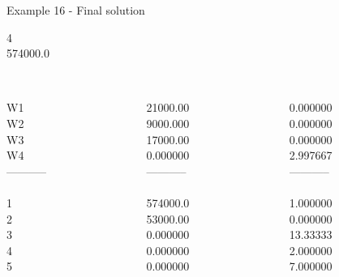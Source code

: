 \begin{frame}{Example 16 - Final solution}

  4\\
  574000.0\\

\begin{columns}[t]
\begin{column}{0.3\textwidth}
\\
W1\\
W2\\
W3\\
W4\\
-----------\\
\\
1\\
2\\
3\\
4\\
5\\

\end{column}
\begin{column}{0.3\textwidth}
\\
21000.00\\
9000.000\\
17000.00\\
0.000000\\


-----------\\
\\
574000.0\\
53000.00\\
0.000000\\
0.000000\\
0.000000\\

\end{column}  

\begin{column}{0.3\textwidth}
\\
0.000000\\
0.000000\\
0.000000\\
2.997667\\

-----------\\
\\
1.000000\\
0.000000\\
13.33333\\
2.000000\\
7.000000\\
\end{column}
\end{columns}
\end{frame}
